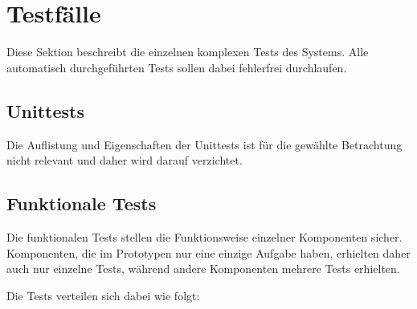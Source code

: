 \section{Testfälle}
\label{sec:eval:testcases}

Diese Sektion beschreibt die einzelnen komplexen Tests des Systems.
Alle automatisch durchgeführten Tests sollen dabei fehlerfrei durchlaufen.

\subsection{Unittests}

Die Auflistung und Eigenschaften der Unittests
ist für die gewählte Betrachtung nicht relevant und
daher wird darauf verzichtet.

\subsection{Funktionale Tests}
Die funktionalen Tests stellen die Funktionsweise einzelner Komponenten sicher.
Komponenten, die im Prototypen nur eine einzige Aufgabe haben,
erhielten daher auch nur einzelne Tests, während andere Komponenten mehrere Tests erhielten.

Die Tests verteilen sich dabei wie folgt:


